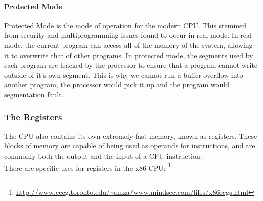 \documentclass[a4paper,11pt]{report}
\begin{document}
				\paragraph{Protected Mode} 
					Protected Mode is the mode of operation for the modern CPU. 
					This stemmed from security and multiprogramming issues found to occur in real mode. 
					In real mode, the current program can access all of the memory of the system, allowing it to overwrite that of other programs. 
					In protected mode, the segments used by each program are tracked by the processor to ensure that a program cannot write outside of it's own segment. 
					This is why we cannot run a buffer overflow into another program, the processor would pick it up and the program would segmentation fault. 
			\subsubsection{The Registers}
				The CPU also contains its own extremely fast memory, known as registers. 
				These blocks of memory are capable of being used as operands for instructions, and are commonly both the output and the input of a CPU instruction.\\ 
				There are specific uses for registers in the x86 CPU: \footnote{\url{http://www.eecg.toronto.edu/~amza/www.mindsec.com/files/x86regs.html}}
\end{document}
